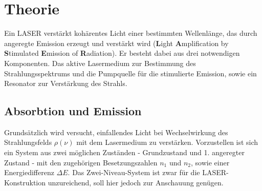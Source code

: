 

\section{Theorie}
\setcounter{page}{1}
Ein LASER verstärkt kohärentes Licht einer bestimmten Wellenlänge, das durch angeregte Emission erzeugt und 
verstärkt wird (\textbf{L}ight \textbf{A}mplification by \textbf{S}timulated \textbf{E}mission of \textbf{R}adiation). Er besteht
dabei aus drei notwendigen Komponenten. Das aktive Lasermedium zur Bestimmung des Strahlungsspektrums und die Pumpquelle 
für die stimulierte Emission, sowie ein Resonator zur Verstärkung des Strahls.


\subsection{Absorbtion und Emission}
Grundsätzlich wird versucht, einfallendes Licht bei Wechselwirkung des Strahlungsfelds $\rho(\nu)$ mit dem Lasermedium zu verstärken. 
Vorzustellen ist sich ein System aus zwei möglichen Zuständen - Grundzustand und 1. angeregter Zustand - mit den zugehörigen 
Besetzungszahlen $n_1$ und $n_2$, sowie einer Energiedifferenz $\Delta E$. Das Zwei-Niveau-System ist zwar für die LASER-Konstruktion unzureichend,
soll hier jedoch zur Anschauung genügen.

